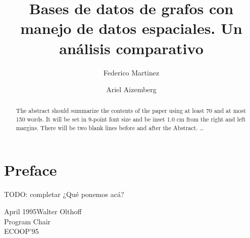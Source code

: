 \documentclass{llncs}
\begin{document}
%
\frontmatter          %
%
\pagestyle{headings}  %
%
\chapter*{Preface}
%
TODO: completar
¿Qué ponemos acá?

\vspace{1cm}
\begin{flushright}\noindent
April 1995\hfill Walter Olthoff\\
Program Chair\\
ECOOP'95
\end{flushright}
%

%
\tableofcontents
%
\mainmatter              %
%
\title{Bases de datos de grafos con manejo de datos espaciales.
Un análisis comparativo}
%
%
\author{Federico Martinez \and Ariel Aizemberg}
%
%
%

\maketitle              %

\begin{abstract} The abstract should summarize the contents of the
paper using at least 70 and at most 150 words. It will be set in
9-point font size and be inset 1.0 cm from the right and left margins.
There will be two blank lines before and after the Abstract. \dots
{}
\end{abstract} %
\end{document}
